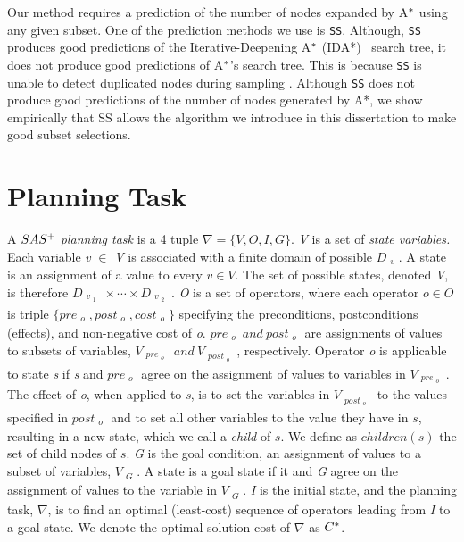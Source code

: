 Our method requires a prediction of the number of nodes expanded by A$\sp{*}$ using any given subset. One of the prediction methods we use is \texttt{SS}. Although, \texttt{SS} produces good predictions of the Iterative-Deepening A$\sp{*}$ (IDA*)~\cite{Korf85ida} search tree, it does not produce good predictions of A$\sp{*}$'s search tree. This is because \texttt{SS} is unable to detect duplicated nodes during sampling \cite{lelis2014estimating}. Although \texttt{SS} does not produce good predictions of the number of nodes generated by A*, we show empirically that SS allows the algorithm we introduce in this dissertation to make good subset selections.

\section{Planning Task}

A $SAS\sp{+}$ \emph{planning task} \cite{backstrom1995complexity} is a 4 tuple $\nabla = \{V, O, I, G\}.$ \textit{V} is a set of \textit{state variables.} Each variable \textit{v} $\in$ \textit{V} is associated with a finite domain of possible $D_{\substack{v}}$. A state is an assignment of a value to every $v \in V.$ The set of possible states, denoted \textit{V}, is therefore $D_{\substack{v_{\substack{1}}}}    \times \cdots \times D_{\substack{v_{\substack{2}}}}$. \textit{O} is a set of operators, where each operator $o \in O$ is triple $\{pre_{\substack{o}} , post_{\substack{o}}, cost_{\substack{o}}\}$ specifying the preconditions, postconditions (effects), and non-negative cost of \textit{o}. $pre_{\substack{o}}\ and\ post_{\substack{o}}$ are assignments of values to subsets of variables, $V_{\substack{pre_{\substack{o}}}}\ and\ V_{\substack{post_{\substack{o}}}}$, respectively. Operator \textit{o} is applicable to state \textit{s} if \textit{s} and $pre_{\substack{o}}$ agree on the assignment of values to variables in $V_{\substack{pre_{\substack{o}}}}$. The effect of \textit{o}, when applied to \textit{s}, is to set the variables in $V_{\substack{post_{\substack{o}}}}$ to the values specified in $post_{\substack{o}}$ and to set all other variables to the value they have in $s$, resulting in a new state, which we call a \emph{child} of $s$. We define as $children(s)$ the set of child nodes of $s$. \textit{G} is the goal condition, an assignment of values to a subset of variables, $V_{\substack{G}}$. A state is a goal state if it and \textit{G} agree on the assignment of values to the variable in $V_{\substack{G}}$. \textit{I} is the initial state, and the planning task, $\nabla$, is to find an optimal (least-cost) sequence of operators leading from \textit{I} to a goal state. We denote the optimal solution cost of $\nabla$ as $C\sp{*}$. 

